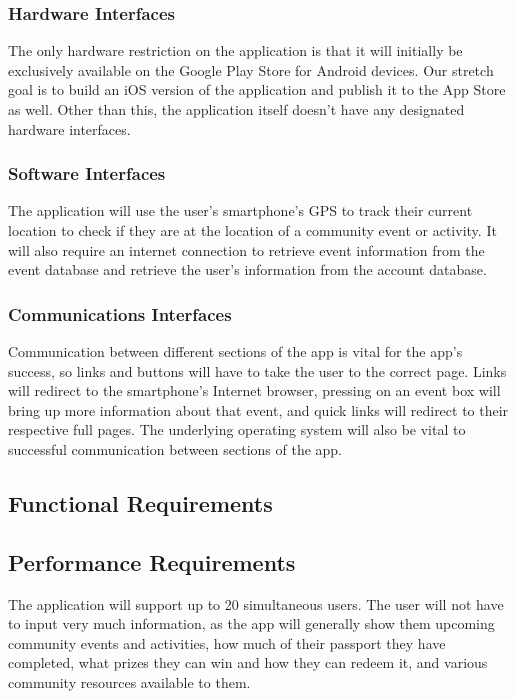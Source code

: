 \documentclass[draftclsnofoot, onecolumn, 10pt, compsoc]{IEEEtran}
\begin{document}
			\subsubsection{Hardware Interfaces}
				The only hardware restriction on the application is that it will initially be exclusively available on the Google Play Store for Android devices. Our stretch goal is to build an iOS version of the application and publish it to the App Store as well. Other than this, the application itself doesn't have any designated hardware interfaces.
			
			\subsubsection{Software Interfaces}
				The application will use the user's smartphone's GPS to track their current location to check if they are at the location of a community event or activity. It will also require an internet connection to retrieve event information from the event database and retrieve the user's information from the account database.
			
			\subsubsection{Communications Interfaces}
				Communication between different sections of the app is vital for the app's success, so links and buttons will have to take the user to the correct page. Links will redirect to the smartphone's Internet browser, pressing on an event box will bring up more information about that event, and quick links will redirect to their respective full pages. The underlying operating system will also be vital to successful communication between sections of the app.
			
		\subsection{Functional Requirements}
		
		\subsection{Performance Requirements}
			The application will support up to 20 simultaneous users. The user will not have to input very much information, as the app will generally show them upcoming community events and activities, how much of their passport they have completed, what prizes they can win and how they can redeem it, and various community resources available to them.
		
\end{document}
